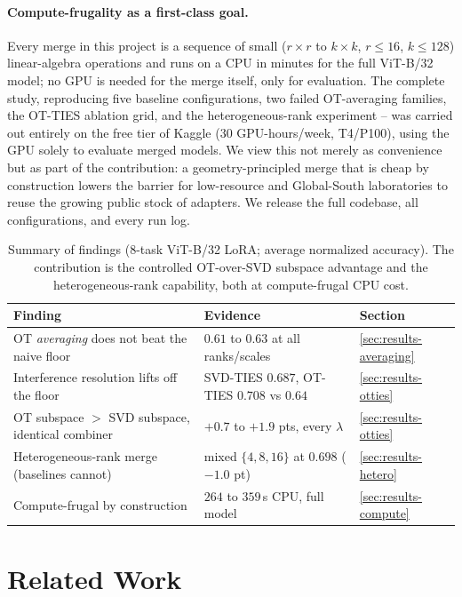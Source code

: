 \documentclass[11pt]{article}
\newcommand{\otties}{\textsc{OT-TIES}}
\newcommand{\svdties}{\textsc{SVD-TIES}}
\begin{document}
\paragraph{Compute-frugality as a first-class goal.}
Every merge in this project is a sequence of small ($r\times r$ to $k\times k$, $r\le 16$, $k\le 128$)
linear-algebra operations and runs on a CPU in minutes for the full ViT-B/32 model; no GPU is needed for
the merge itself, only for evaluation. The complete study, reproducing five baseline configurations,
two failed OT-averaging families, the \otties{} ablation grid, and the heterogeneous-rank experiment --
was carried out entirely on the free tier of Kaggle (30 GPU-hours/week, T4/P100), using the GPU solely to
evaluate merged models. We view this not merely as convenience but as part of the contribution: a
geometry-principled merge that is cheap by construction lowers the barrier for low-resource and
Global-South laboratories to reuse the growing public stock of adapters. We release the full codebase,
all configurations, and every run log.

\begin{table}[t]
\centering
\caption{Summary of findings (8-task ViT-B/32 LoRA; average normalized accuracy). The contribution is
the controlled OT-over-SVD subspace advantage and the heterogeneous-rank capability, both at
compute-frugal CPU cost.}
\label{tab:summary}
\small
\begin{tabular}{lll}
\toprule
Finding & Evidence & Section \\
\midrule
OT \emph{averaging} does not beat the naive floor & $0.61$ to $0.63$ at all ranks/scales & \ref{sec:results-averaging} \\
Interference resolution lifts off the floor & \svdties{} $0.687$, \otties{} $0.708$ vs $0.64$ & \ref{sec:results-otties} \\
OT subspace $>$ SVD subspace, identical combiner & $+0.7$ to $+1.9$ pts, every $\lambda$ & \ref{sec:results-otties} \\
Heterogeneous-rank merge (baselines cannot) & mixed $\{4,8,16\}$ at $0.698$ ($-1.0$ pt) & \ref{sec:results-hetero} \\
Compute-frugal by construction & $264$ to $359$\,s CPU, full model & \ref{sec:results-compute} \\
\bottomrule
\end{tabular}
\end{table}

\section{Related Work}
\label{sec:related}
\end{document}
